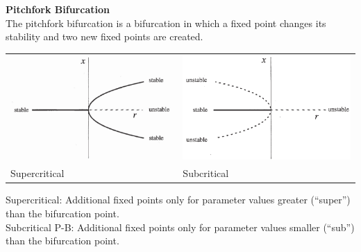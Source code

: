 \textbf{Pitchfork Bifurcation}\\
The pitchfork bifurcation is a bifurcation in which a fixed point changes its stability and two new fixed points are created.\\
\begin{table}[H]
  \setlength{\tabcolsep}{0.2em}
  \footnotesize
  \begin{tabular}{p{}@{\hskip 1em}p{}}
    \includegraphics[width=\linewidth]{Pics/9.2.png} & \includegraphics[width=\linewidth]{Pics/9.3.png}\\
    Supercritical & Subcritical
  \end{tabular}
\end{table}
Supercritical: Additional fixed points only for parameter values greater (“super”) than the bifurcation point.\\
Subcritical P-B: Additional fixed points only for parameter values smaller (“sub”) than the bifurcation point.\\

